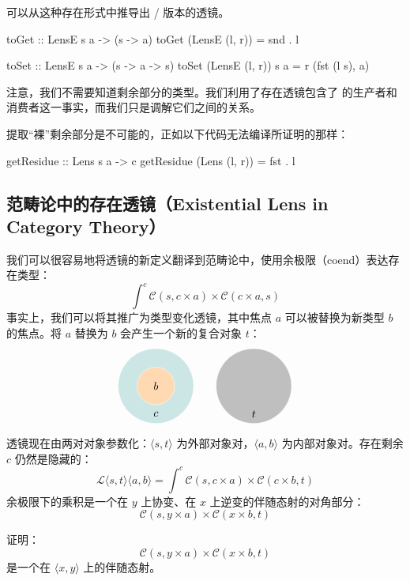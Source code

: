 \documentclass[DaoFP]{subfiles}
\begin{document}
 可以从这种存在形式中推导出 / 版本的透镜。
 \begin{haskell}
  toGet :: LensE s a -> (s -> a)
  toGet (LensE (l, r)) = snd . l

  toSet :: LensE s a -> (s -> a -> s)
  toSet (LensE (l, r)) s a = r (fst (l s), a)
 \end{haskell}

 注意，我们不需要知道剩余部分的类型。我们利用了存在透镜包含了  的生产者和消费者这一事实，而我们只是调解它们之间的关系。

 提取“裸”剩余部分是不可能的，正如以下代码无法编译所证明的那样：
 \begin{haskell}
  getResidue :: Lens s a -> c
  getResidue (Lens (l, r)) = fst . l
 \end{haskell}

 \subsection{范畴论中的存在透镜（Existential Lens in Category Theory）}

 我们可以很容易地将透镜的新定义翻译到范畴论中，使用余极限（coend）表达存在类型：
 \[ \int^{c} \mathcal{C}(s, c \times a) \times  \mathcal{C}(c \times a, s) \]
 事实上，我们可以将其推广为类型变化透镜，其中焦点 $a$ 可以被替换为新类型 $b$ 的焦点。将 $a$ 替换为 $b$ 会产生一个新的复合对象 $t$：
 \[
  \begin{tikzpicture}
   \filldraw[fill=blue!50!green!20, draw=white] (0, 0) circle (1.2);
   \filldraw[fill=orange!30, draw=white] (0, 0) circle (0.6);
   \node at (0, 0) {$b$};
   \node at (0, -0.9) {$c$};
  \end{tikzpicture}
  \hspace{20pt}
  \begin{tikzpicture}
   \filldraw[fill=gray!50, draw=white] (0, 0) circle (1.2);
   \node at (0, -0.9) {$t$};
  \end{tikzpicture}
 \]

 透镜现在由两对对象参数化：$\langle s, t\rangle$ 为外部对象对，$\langle a, b \rangle$ 为内部对象对。存在剩余 $c$ 仍然是隐藏的：
 \[ \mathcal{L}\langle s, t\rangle \langle a, b \rangle = \int^{c} \mathcal{C}(s, c \times a) \times  \mathcal{C}(c \times b, t) \]
 余极限下的乘积是一个在 $y$ 上协变、在 $x$ 上逆变的伴随态射的对角部分：
 \[ \mathcal{C}(s, y \times a) \times  \mathcal{C}(x \times b, t) \]
 \begin{exercise}
  证明：
  \[ \mathcal{C}(s, y \times a) \times  \mathcal{C}(x \times b, t) \]
  是一个在 $\langle x, y\rangle$ 上的伴随态射。
 \end{exercise}
\end{document}
